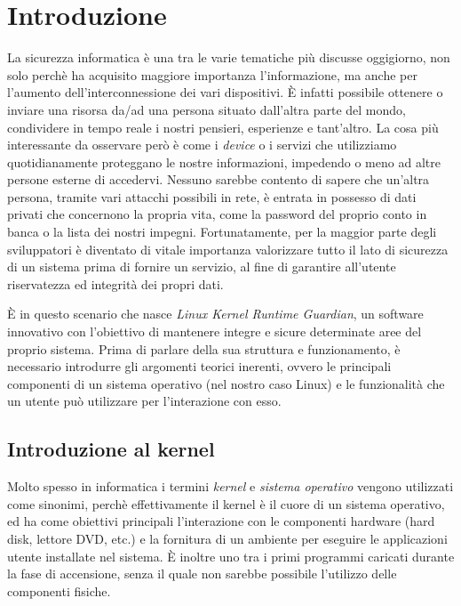 \chapter{Introduzione}

\label{Chapter1}

La sicurezza informatica è una tra le varie tematiche più discusse oggigiorno, non solo perchè ha acquisito maggiore importanza l'informazione, ma anche per l'aumento dell'interconnessione dei vari dispositivi. È infatti possibile ottenere o inviare una risorsa da/ad una persona situato dall'altra parte del mondo, condividere in tempo reale i nostri pensieri, esperienze e tant'altro. La cosa più interessante da osservare però è come i \emph{device} o i servizi che utilizziamo quotidianamente proteggano le nostre informazioni, impedendo o meno ad altre persone esterne di accedervi. Nessuno sarebbe contento di sapere che un'altra persona, tramite vari attacchi possibili in rete, è entrata in possesso di dati privati che concernono la propria vita, come la password del proprio conto in banca o la lista dei nostri impegni.
Fortunatamente, per la maggior parte degli sviluppatori è diventato di vitale importanza valorizzare tutto il lato di sicurezza di un sistema prima di fornire un servizio, al fine di garantire all'utente riservatezza ed integrità dei propri dati.

È in questo scenario che nasce \emph{Linux Kernel Runtime Guardian}, un software innovativo con l'obiettivo di mantenere integre e sicure determinate aree del proprio sistema. Prima di parlare della sua struttura e funzionamento, è necessario introdurre gli argomenti teorici inerenti, ovvero le principali componenti di un sistema operativo (nel nostro caso Linux) e le funzionalità che un utente può utilizzare per l'interazione con esso.

\section{Introduzione al kernel}

Molto spesso in informatica i termini \emph{kernel} e \emph{sistema operativo} vengono utilizzati come sinonimi, perchè effettivamente il kernel è il cuore di un sistema operativo, ed ha come obiettivi principali l'interazione con le componenti hardware (hard disk, lettore DVD, etc.) e la fornitura di un ambiente per eseguire le applicazioni utente installate nel sistema.
È inoltre uno tra i primi programmi caricati durante la fase di accensione, senza il quale non sarebbe possibile l'utilizzo delle componenti fisiche.

